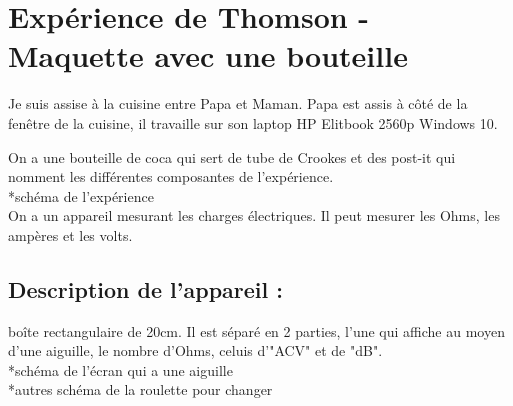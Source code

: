 \documentclass[../main.tex]{subfiles}
\begin{document}
\section{Expérience de Thomson - Maquette avec une bouteille}
Je suis assise à la cuisine entre Papa et Maman. Papa est assis à côté de la fenêtre de la cuisine, il travaille sur son laptop HP Elitbook 2560p Windows 10.\\
\par On a une bouteille de coca qui sert de tube de Crookes et des post-it qui nomment les différentes composantes de l'expérience.\\
*schéma de l'expérience\\
On a un appareil mesurant les charges électriques. Il peut mesurer les Ohms, les ampères et les volts.\\
\subsection{Description de l'appareil : }
boîte rectangulaire de 20cm. Il est séparé en 2 parties, l'une qui affiche au moyen d'une aiguille, le nombre d'Ohms, celuis d'"ACV" et de "dB".\\
*schéma de l'écran qui a une aiguille\\
*autres schéma de la roulette pour changer\\
\end{document}
